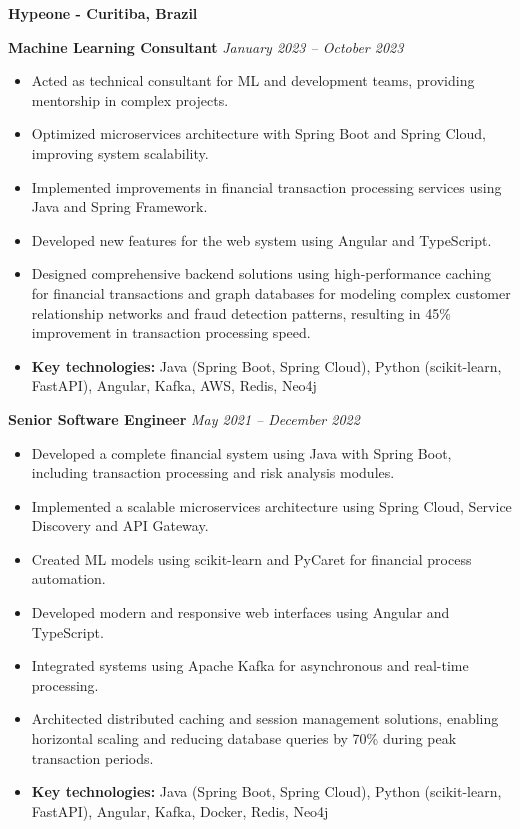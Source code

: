\documentclass[12pt,a4paper,sans]{moderncv}        %
\begin{document}
\vspace{24pt}
\small{\textbf{Hypeone - Curitiba, Brazil}}
\vspace{3pt}

\textbf{Machine Learning Consultant} \hfill \textit{January 2023 -- October 2023}
\begin{itemize}
    \item Acted as technical consultant for ML and development teams, providing mentorship in complex projects.
    \item Optimized microservices architecture with Spring Boot and Spring Cloud, improving system scalability.
    \item Implemented improvements in financial transaction processing services using Java and Spring Framework.
    \item Developed new features for the web system using Angular and TypeScript.
    \item Designed comprehensive backend solutions using high-performance caching for financial transactions and graph databases for modeling complex customer relationship networks and fraud detection patterns, resulting in 45\% improvement in transaction processing speed.
    \item \textbf{Key technologies:} Java (Spring Boot, Spring Cloud), Python (scikit-learn, FastAPI), Angular, Kafka, AWS, Redis, Neo4j
\end{itemize}

\vspace{12pt}
\textbf{Senior Software Engineer} \hfill \textit{May 2021 -- December 2022}
\begin{itemize}
    \item Developed a complete financial system using Java with Spring Boot, including transaction processing and risk analysis modules.
    \item Implemented a scalable microservices architecture using Spring Cloud, Service Discovery and API Gateway.
    \item Created ML models using scikit-learn and PyCaret for financial process automation.
    \item Developed modern and responsive web interfaces using Angular and TypeScript.
    \item Integrated systems using Apache Kafka for asynchronous and real-time processing.
    \item Architected distributed caching and session management solutions, enabling horizontal scaling and reducing database queries by 70\% during peak transaction periods.
    \item \textbf{Key technologies:} Java (Spring Boot, Spring Cloud), Python (scikit-learn, FastAPI), Angular, Kafka, Docker, Redis, Neo4j
\end{itemize}
\end{document}
